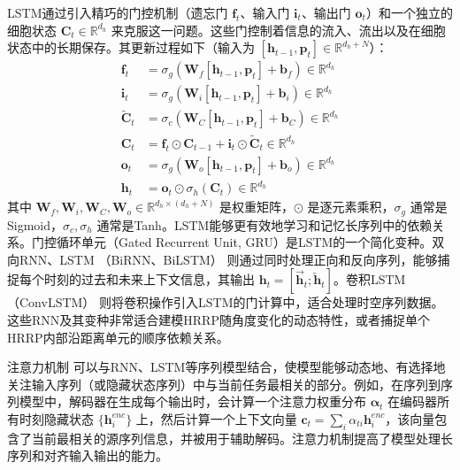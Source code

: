 LSTM通过引入精巧的门控机制（遗忘门 $\mathbf{f}_t$、输入门 $\mathbf{i}_t$、输出门 $\mathbf{o}_t$）和一个独立的细胞状态 $\mathbf{C}_t \in \mathbb{R}^{d_h}$ 来克服这一问题。这些门控制着信息的流入、流出以及在细胞状态中的长期保存。其更新过程如下（输入为 $[\mathbf{h}_{t-1}, \mathbf{p}_t] \in \mathbb{R}^{d_h+N}$）：
\begin{align}
    \mathbf{f}_t &= \sigma_g(\mathbf{W}_f [\mathbf{h}_{t-1}, \mathbf{p}_t] + \mathbf{b}_f) \in \mathbb{R}^{d_h} \label{eq:lstm_f_dim} \\
    \mathbf{i}_t &= \sigma_g(\mathbf{W}_i [\mathbf{h}_{t-1}, \mathbf{p}_t] + \mathbf{b}_i) \in \mathbb{R}^{d_h} \label{eq:lstm_i_dim} \\
    \tilde{\mathbf{C}}_t &= \sigma_c(\mathbf{W}_C [\mathbf{h}_{t-1}, \mathbf{p}_t] + \mathbf{b}_C) \in \mathbb{R}^{d_h} \label{eq:lstm_c_tilde_dim} \\
    \mathbf{C}_t &= \mathbf{f}_t \odot \mathbf{C}_{t-1} + \mathbf{i}_t \odot \tilde{\mathbf{C}}_t \in \mathbb{R}^{d_h} \label{eq:lstm_c_dim} \\
    \mathbf{o}_t &= \sigma_g(\mathbf{W}_o [\mathbf{h}_{t-1}, \mathbf{p}_t] + \mathbf{b}_o) \in \mathbb{R}^{d_h} \label{eq:lstm_o_dim} \\
    \mathbf{h}_t &= \mathbf{o}_t \odot \sigma_h(\mathbf{C}_t) \in \mathbb{R}^{d_h} \label{eq:lstm_h_dim}
\end{align}
其中 $\mathbf{W}_f, \mathbf{W}_i, \mathbf{W}_C, \mathbf{W}_o \in \mathbb{R}^{d_h \times (d_h+N)}$ 是权重矩阵，$\odot$ 是逐元素乘积，$\sigma_g$ 通常是Sigmoid，$\sigma_c, \sigma_h$ 通常是Tanh。LSTM能够更有效地学习和记忆长序列中的依赖关系。门控循环单元（Gated Recurrent Unit, GRU）是LSTM的一个简化变种。双向RNN、LSTM （BiRNN、BiLSTM） 则通过同时处理正向和反向序列，能够捕捉每个时刻的过去和未来上下文信息，其输出 $\mathbf{h}_t = [\overrightarrow{\mathbf{h}}_t; \overleftarrow{\mathbf{h}}_t]$。卷积LSTM （ConvLSTM） 则将卷积操作引入LSTM的门计算中，适合处理时空序列数据。这些RNN及其变种非常适合建模HRRP随角度变化的动态特性，或者捕捉单个HRRP内部沿距离单元的顺序依赖关系。

注意力机制 可以与RNN、LSTM等序列模型结合，使模型能够动态地、有选择地关注输入序列（或隐藏状态序列）中与当前任务最相关的部分。例如，在序列到序列模型中，解码器在生成每个输出时，会计算一个注意力权重分布 $\boldsymbol{\alpha}_t$ 在编码器所有时刻隐藏状态 $\{\mathbf{h}_i^{enc}\}$ 上，然后计算一个上下文向量 $\mathbf{c}_t = \sum_i \alpha_{ti} \mathbf{h}_i^{enc}$，该向量包含了当前最相关的源序列信息，并被用于辅助解码。注意力机制提高了模型处理长序列和对齐输入输出的能力。

